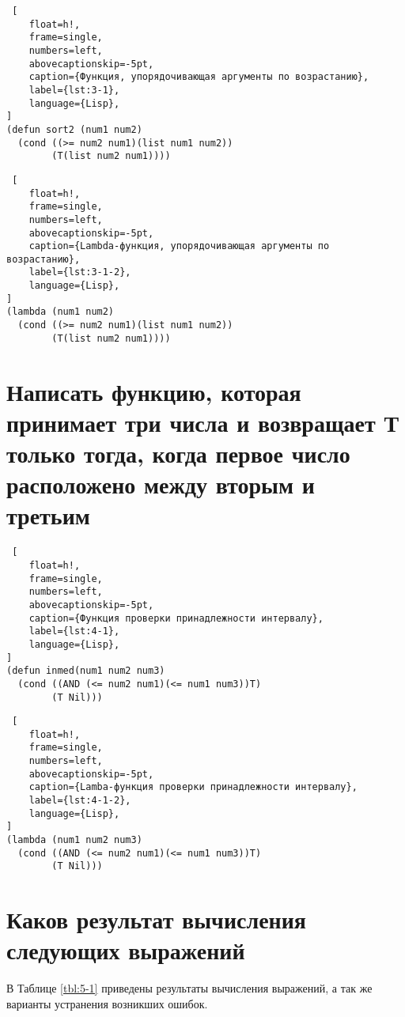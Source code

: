 \begin{lstlisting} [
	float=h!,
	frame=single,
	numbers=left,
	abovecaptionskip=-5pt,
	caption={Функция, упорядочивающая аргументы по возрастанию},
	label={lst:3-1},
	language={Lisp},
]
(defun sort2 (num1 num2)
  (cond ((>= num2 num1)(list num1 num2))
        (T(list num2 num1))))
\end{lstlisting}

\begin{lstlisting} [
	float=h!,
	frame=single,
	numbers=left,
	abovecaptionskip=-5pt,
	caption={Lambda-функция, упорядочивающая аргументы по возрастанию},
	label={lst:3-1-2},
	language={Lisp},
]
(lambda (num1 num2)
  (cond ((>= num2 num1)(list num1 num2))
        (T(list num2 num1))))
\end{lstlisting}

\section{Написать функцию, которая принимает три числа и возвращает Т только тогда, когда первое число расположено между вторым и третьим}

\begin{lstlisting} [
	float=h!,
	frame=single,
	numbers=left,
	abovecaptionskip=-5pt,
	caption={Функция проверки принадлежности интервалу},
	label={lst:4-1},
	language={Lisp},
]
(defun inmed(num1 num2 num3)
  (cond ((AND (<= num2 num1)(<= num1 num3))T)
        (T Nil)))
\end{lstlisting}

\begin{lstlisting} [
	float=h!,
	frame=single,
	numbers=left,
	abovecaptionskip=-5pt,
	caption={Lamba-функция проверки принадлежности интервалу},
	label={lst:4-1-2},
	language={Lisp},
]
(lambda (num1 num2 num3)
  (cond ((AND (<= num2 num1)(<= num1 num3))T)
        (T Nil)))
\end{lstlisting}

\section{Каков результат вычисления следующих выражений}

В Таблице \ref{tbl:5-1} приведены результаты вычисления выражений, а так же варианты устранения возникших ошибок.

